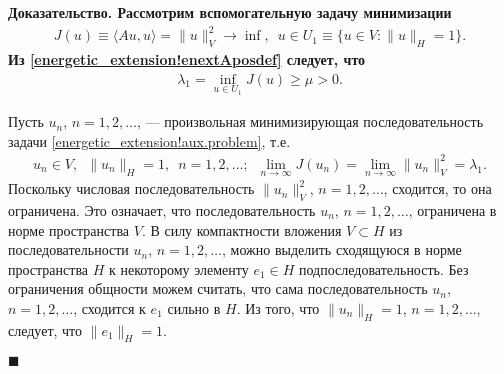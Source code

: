 \documentclass{report}
\newcounter{lem}[section]
\newenvironment{Proof}{\par\noindent\bf Доказательство.\rm}{ $\blacksquare$\par}
\begin{document}
\begin{Proof}
Рассмотрим вспомогательную задачу минимизации
\begin{gather}\label{energetic_extension!aux.problem}
J(u)\equiv\langle Au,u\rangle=\|u\|_V^2\to\inf,\,\,\,u\in U_1\equiv\{u\in V:\|u\|_H=1\}.
\end{gather}
Из \eqref{energetic_extension!enextAposdef} следует, что
\begin{gather*}
\lambda_1=\inf\limits_{u\in U_1}J(u)\geqslant\mu>0.
\end{gather*}

Пусть $u_n$, $n=1,2,\dots$, --- произвольная минимизирующая последовательность задачи \eqref{energetic_extension!aux.problem}, т.е.
\begin{gather*}
u_n\in V,\,\,\,\|u_n\|_H=1,\,\,\,n=1,2,\dots;\,\,\,\lim\limits_{n\to\infty}J(u_n)=\lim\limits_{n\to\infty}\|u_n\|^2_V=\lambda_1.
\end{gather*}
Поскольку числовая последовательность $\|u_n\|^2_V$, $n=1,2,\dots$, сходится, то она ограничена. Это означает, что последовательность $u_n$, $n=1,2,\dots$, ограничена в норме пространства
$V$. В силу компактности вложения $V\subset H$ из последовательности $u_n$, $n=1,2,\dots$, можно выделить сходящуюся в норме пространства $H$ к некоторому элементу $e_1\in H$
подпоследовательность. Без ограничения общности можем считать, что сама последовательность $u_n$, $n=1,2,\dots$, сходится к $e_1$ сильно в $H$. Из того, что $\|u_n\|_H=1$, $n=1,2,\dots$,
следует, что $\|e_1\|_H=1$.


\end{Proof}
\end{document}
